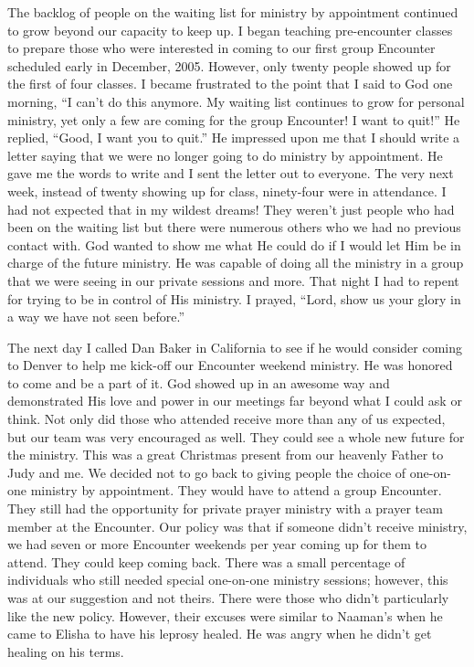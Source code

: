 \documentclass[twoside, 12pt]{book}
\begin{document}
The backlog of people on the waiting list for ministry by appointment continued to grow beyond our capacity to keep up. I began teaching pre-encounter classes to prepare those who were interested in coming to our first group Encounter scheduled early in December, 2005. However, only twenty people showed up for the first of four classes. I became frustrated to the point that I said to God one morning, “I can’t do this anymore. My waiting list continues to grow for personal ministry, yet only a few are coming for the group Encounter! I want to quit!” He replied, “Good, I want you to quit.” He impressed upon me that I should write a letter saying that we were no longer going to do ministry by appointment.  He gave me the words to write and I sent the letter out to everyone. The very next week, instead of twenty showing up for class, ninety-four were in attendance. I had not expected that in my wildest dreams! They weren’t just people who had been on the waiting list but there were numerous others who we had no previous contact with. God wanted to show me what He could do if I would let Him be in charge of the future ministry. He was capable of doing all the ministry in a group that we were seeing in our private sessions and more. That night I had to repent for trying to be in control of His ministry. I prayed, “Lord, show us your glory in a way we have not seen before.” 

The next day I called Dan Baker in California to see if he would consider coming to Denver to help me kick-off our Encounter weekend ministry. He was honored to come and be a part of it. God showed up in an awesome way and demonstrated His love and power in our meetings far beyond what I could ask or think. Not only did those who attended receive more than any of us expected, but our team was very encouraged as well. They could see a whole new future for the ministry. This was a great Christmas present from our heavenly Father to Judy and me. We decided not to go back to giving people the choice of one-on-one ministry by appointment. They would have to attend a group Encounter. They still had the opportunity for private prayer ministry with a prayer team member at the Encounter. Our policy was that if someone didn’t receive ministry, we had seven or more Encounter weekends per year coming up for them to attend. They could keep coming back. There was a small percentage of individuals who still needed special one-on-one ministry sessions; however, this was at our suggestion and not theirs. There were those who didn’t particularly like the new policy. However, their excuses were similar to Naaman’s when he came to Elisha to have his leprosy healed. He was angry when he didn’t get healing on his terms.
\end{document}
